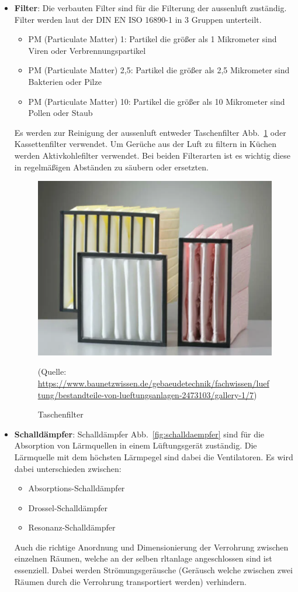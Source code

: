 \begin{itemize}
\item \textbf{Filter}: Die verbauten Filter sind für die Filterung der \gls{aussenluft} zuständig. Filter werden laut der DIN EN ISO 16890-1 in 3 Gruppen unterteilt.
\begin{itemize}
	\item PM (Particulate Matter) 1: Partikel die größer als 1 Mikrometer sind \zB Viren oder Verbrennungspartikel 
	\item PM (Particulate Matter) 2,5: Partikel die größer als 2,5 Mikrometer sind \zB Bakterien oder Pilze
	\item PM (Particulate Matter) 10: Partikel die größer als 10 Mikrometer sind \zB Pollen oder Staub
\end{itemize}
Es werden zur Reinigung der \gls{aussenluft} entweder Taschenfilter Abb.~\ref{fig:taschenfilter} oder Kassettenfilter verwendet. Um Gerüche aus der Luft zu filtern \zB in Küchen werden Aktivkohlefilter verwendet. Bei beiden Filterarten ist es wichtig diese in regelmäßigen Abständen zu säubern oder ersetzten.  

\begin{figure}[H]
	\centering
	\includegraphics[width=0.5\linewidth]{Bilder/normalefilter}
	\caption{Taschenfilter} 
	(Quelle: \url{	https://www.baunetzwissen.de/gebaeudetechnik/fachwissen/lueftung/bestandteile-von-lueftungsanlagen-2473103/gallery-1/7})
	\label{fig:taschenfilter}
\end{figure}

	\item \textbf{Schalldämpfer}: Schalldämpfer Abb.~\ref{fig:schalldaempfer} sind für die Absorption von Lärmquellen in einem Lüftungsgerät zuständig. Die Lärmquelle mit dem höchsten Lärmpegel sind dabei die Ventilatoren. Es wird dabei unterschieden zwischen:
\begin{itemize}
	\item Absorptions-Schalldämpfer 
	\item Drossel-Schalldämpfer
	\item Resonanz-Schalldämpfer
\end{itemize} 
	Auch die richtige Anordnung und Dimensionierung der Verrohrung zwischen einzelnen Räumen, welche an der selben \ac{rltanlage} angeschlossen sind ist essenziell. Dabei werden Strömungsgeräusche (Geräusch welche zwischen zwei Räumen durch die Verrohrung transportiert werden) verhindern.


\end{itemize}
